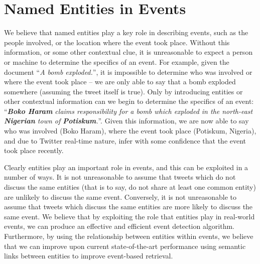 


\section{Named Entities in Events}
\label{detection:sec:entityEvents}
We believe that named entities play a key role in describing events, such as the people involved, or the location where the event took place. Without this information, or some other contextual clue, it is unreasonable to expect a person or machine to determine the specifics of an event. For example, given the document ``\textit{A bomb exploded.}'', it is impossible to determine who was involved or where the event took place -- we are only able to say that a bomb exploded somewhere (assuming the tweet itself is true). Only by introducing entities or other contextual information can we begin to determine the specifics of an event: ``\textit{\textbf{Boko Haram} claims responsibility for a bomb which exploded in the north-east \textbf{Nigerian} town of \textbf{Potiskum}.}''. Given this information, we are now able to say who was involved (Boko Haram), where the event took place (Potiskum, Nigeria), and due to Twitter real-time nature, infer with some confidence that the event took place recently.

Clearly entities play an important role in events, and this can be exploited in a number of ways.  It is not unreasonable to assume that tweets which do not discuss the same entities (that is to say, do not share at least one common entity) are unlikely to discuss the same event. Conversely, it is not unreasonable to assume that tweets which discuss the same entities are more likely to discuss the same event. We believe that by exploiting the role that entities play in real-world events, we can produce an effective and efficient event detection algorithm. Furthermore, by using the relationship between entities within events, we believe that we can improve upon current state-of-the-art performance using semantic links between entities to improve event-based retrieval.

